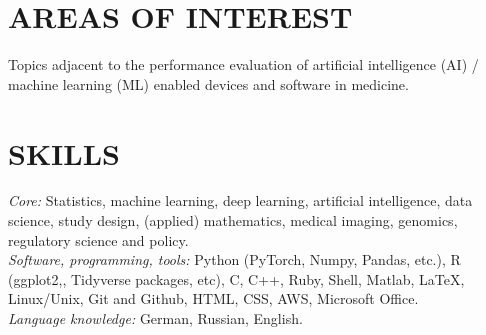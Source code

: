 \documentclass[overlapped, line, 10pt]{res} %
\begin{document}


\address{
  Web: \href{http://www.alexejgossmann.com/}{alexejgossmann.com} \textbar
  LinkedIn: \href{https://www.linkedin.com/in/alexejgossmann/}{alexejgossmann} \textbar
  Github: \href{https://github.com/agisga}{agisga} \textbar
  Email: \href{mailto:0foldcv@pm.me}{0foldcv@pm.me}
}


\begin{resume}




\section{AREAS OF INTEREST}

Topics adjacent to the performance evaluation of artificial intelligence (AI) / machine learning (ML) enabled devices and software in medicine.


\section{SKILLS}

{\sl Core:} Statistics, machine learning, deep learning, artificial intelligence, data science, study design, (applied) mathematics, medical imaging, genomics, regulatory science and policy.\\
{\sl Software, programming, tools:} Python (PyTorch, Numpy, Pandas, etc.), R (ggplot2,, Tidyverse packages, etc), C, C++, Ruby, Shell, Matlab, \LaTeX, Linux/Unix, Git and Github, HTML, CSS, AWS, Microsoft Office.\\
{\sl Language knowledge:} German, Russian, English.


\end{resume}
\end{document}
